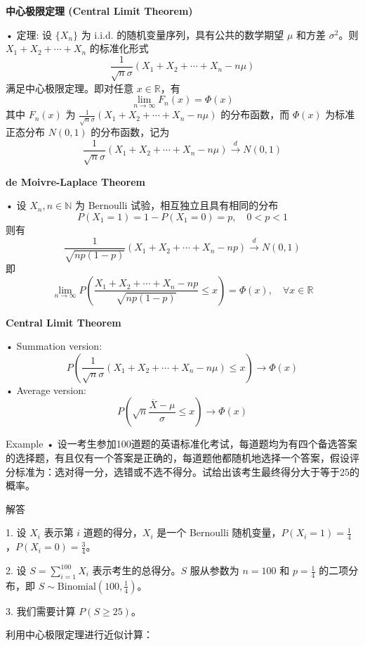 \documentclass[UTF8]{report}
\theoremstyle{MyLineTheoremStyle} %
\theoremstyle{MyBlockTheoremStyle} %
\theoremstyle{MySubsubsectionStyle} %
\begin{document}
\vspace{1cm}

\textbf{中心极限定理 (Central Limit Theorem)}\par
• 定理: 设 $\{X_n\}$ 为 i.i.d. 的随机变量序列，具有公共的数学期望 $\mu$ 和方差 $\sigma^2$。则 $X_1 + X_2 + \cdots + X_n$ 的标准化形式
\[
\frac{1}{\sqrt{n}\sigma} (X_1 + X_2 + \cdots + X_n - n\mu)
\]
满足中心极限定理。即对任意 $x \in \mathbb{R}$，有
\[
\lim_{n \to \infty} F_n(x) = \Phi(x)
\]
其中 $F_n(x)$ 为 $\frac{1}{\sqrt{n}\sigma} (X_1 + X_2 + \cdots + X_n - n\mu)$ 的分布函数，而 $\Phi(x)$ 为标准正态分布 $N(0,1)$ 的分布函数，记为
\[
\frac{1}{\sqrt{n}\sigma} (X_1 + X_2 + \cdots + X_n - n\mu) \xrightarrow{d} N(0,1)
\]

\textbf{de Moivre-Laplace Theorem}\par
• 设 $X_n, n \in \mathbb{N}$ 为 Bernoulli 试验，相互独立且具有相同的分布
\[
P(X_1 = 1) = 1 - P(X_1 = 0) = p, \quad 0 < p < 1
\]
则有
\[
\frac{1}{\sqrt{np(1-p)}} (X_1 + X_2 + \cdots + X_n - np) \xrightarrow{d} N(0,1)
\]
即
\[
\lim_{n \to \infty} P\left(\frac{X_1 + X_2 + \cdots + X_n - np}{\sqrt{np(1-p)}} \leq x\right) = \Phi(x), \quad \forall x \in \mathbb{R}
\]

\vspace{1cm}

\textbf{Central Limit Theorem}\par
• Summation version:
\[
P\left(\frac{1}{\sqrt{n}\sigma} (X_1 + X_2 + \cdots + X_n - n\mu) \leq x\right) \to \Phi(x)
\]
• Average version:
\[
P\left(\sqrt{n} \frac{\overline{X} - \mu}{\sigma} \leq x\right) \to \Phi(x)
\]\par

\vspace{1cm}

Example
• 设一考生参加100道题的英语标准化考试，每道题均为有四个备选答案的选择题，有且仅有一个答案是正确的，每道题他都随机地选择一个答案，假设评分标准为：选对得一分，选错或不选不得分。试给出该考生最终得分大于等于25的概率。

解答

1. 设 $X_i$ 表示第 $i$ 道题的得分，$X_i$ 是一个 Bernoulli 随机变量，$P(X_i = 1) = \frac{1}{4}$，$P(X_i = 0) = \frac{3}{4}$。\par
2. 设 $S = \sum_{i=1}^{100} X_i$ 表示考生的总得分。$S$ 服从参数为 $n = 100$ 和 $p = \frac{1}{4}$ 的二项分布，即 $S \sim \text{Binomial}(100, \frac{1}{4})$。\par
3. 我们需要计算 $P(S \geq 25)$。

利用中心极限定理进行近似计算：
\end{document}
